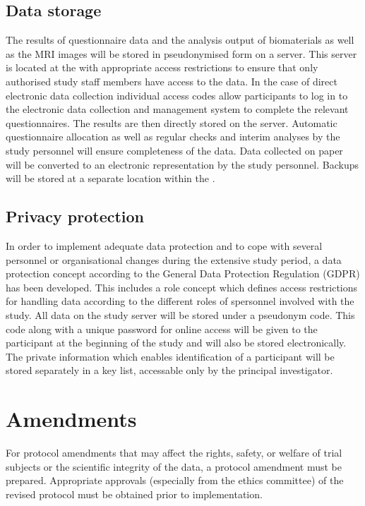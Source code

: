 \subsection{Data storage}
The results of questionnaire data and the analysis output of biomaterials as well as the \acs{MRI} images will be stored in pseudonymised form on a server. This server is located at the \UKM{} with appropriate access restrictions to ensure that only authorised study staff members have access to the data. In the case of direct electronic data collection individual access codes allow participants to log in to the electronic data collection and management system to complete the relevant questionnaires. The results are then directly stored on the server. Automatic questionnaire allocation as well as regular checks and interim analyses by the study personnel will ensure completeness of the data. Data collected on paper will be converted to an electronic representation by the study personnel. Backups will be stored at a separate location within the \UKM{}. 

\subsection{Privacy protection}
In order to implement adequate data protection and to cope with several personnel or organisational changes during the extensive study period, a data protection concept according to the General Data Protection Regulation (GDPR) has been developed. This includes a role concept which defines access restrictions for handling data according to the different roles of spersonnel involved with the study. All data on the study server will be stored under a pseudonym code. This code along with a unique password for online access will be given to the participant at the beginning of the study and will also be stored electronically. The private information which enables identification of a participant will be stored separately in a key list, accessable only by the principal investigator. 

\section{Amendments}
For protocol amendments that may affect the rights, safety, or welfare of trial subjects or the scientific integrity of the data, a protocol amendment must be prepared. Appropriate approvals (especially from the ethics committee) of the revised protocol must be obtained prior to implementation.

